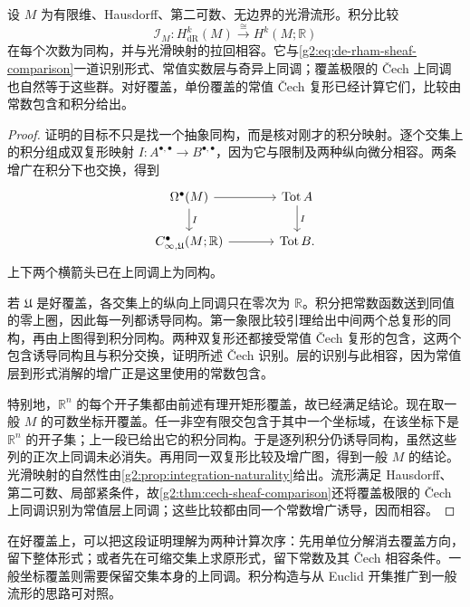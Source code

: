 \begin{theorem}[de Rham 定理]\label{g2:thm:de-rham}
	设 \(M\) 为有限维、Hausdorff、第二可数、无边界的光滑流形。积分比较
	\[
		\mathcal I_M:H_{\mathrm{dR}}^k(M)\xrightarrow{\ \cong\ }H^k(M;\mathbb R)
	\]
	在每个次数为同构，并与光滑映射的拉回相容。它与\eqref{g2:eq:de-rham-sheaf-comparison}一道识别形式、常值实数层与奇异上同调；覆盖极限的 Čech 上同调也自然等于这些群。对好覆盖，单份覆盖的常值 Čech 复形已经计算它们，比较由常数包含和积分给出。
\end{theorem}
\begin{proof}
	证明的目标不只是找一个抽象同构，而是核对刚才的积分映射。逐个交集上的积分组成双复形映射 \(I:A^{\bullet,\bullet}\to B^{\bullet,\bullet}\)，因为它与限制及两种纵向微分相容。两条增广在积分下也交换，得到
	\[
		\begin{tikzcd}[column sep=large]
			\Omega^\bullet(M) \arrow[r] \arrow[d,"I"] & \operatorname{Tot} A \arrow[d,"I"] \\
			C_{\infty,\mathfrak U}^\bullet(M;\mathbb R) \arrow[r] & \operatorname{Tot} B .
		\end{tikzcd}
	\]
	上下两个横箭头已在上同调上为同构。

	若 \(\mathfrak U\) 是好覆盖，各交集上的纵向上同调只在零次为 \(\mathbb R\)。积分把常数函数送到同值的零上圈，因此每一列都诱导同构。第一象限比较引理给出中间两个总复形的同构，再由上图得到积分同构。两种双复形还都接受常值 Čech 复形的包含，这两个包含诱导同构且与积分交换，证明所述 Čech 识别。层的识别与此相容，因为常值层到形式消解的增广正是这里使用的常数包含。

	特别地，\(\mathbb R^n\) 的每个开子集都由前述有理开矩形覆盖，故已经满足结论。现在取一般 \(M\) 的可数坐标开覆盖。任一非空有限交包含于其中一个坐标域，在该坐标下是 \(\mathbb R^n\) 的开子集；上一段已给出它的积分同构。于是逐列积分仍诱导同构，虽然这些列的正次上同调未必消失。再用同一双复形比较及增广图，得到一般 \(M\) 的结论。光滑映射的自然性由\cref{g2:prop:integration-naturality}给出。流形满足 Hausdorff、第二可数、局部紧条件，故\cref{g2:thm:cech-sheaf-comparison}还将覆盖极限的 Čech 上同调识别为常值层上同调；这些比较都由同一个常数增广诱导，因而相容。
\end{proof}

在好覆盖上，可以把这段证明理解为两种计算次序：先用单位分解消去覆盖方向，留下整体形式；或者先在可缩交集上求原形式，留下常数及其 Čech 相容条件。一般坐标覆盖则需要保留交集本身的上同调。积分构造与从 Euclid 开集推广到一般流形的思路可对照\cite[第18章，Smooth Singular Homology 与 The de Rham Theorem]{Lee2012Smooth}。

